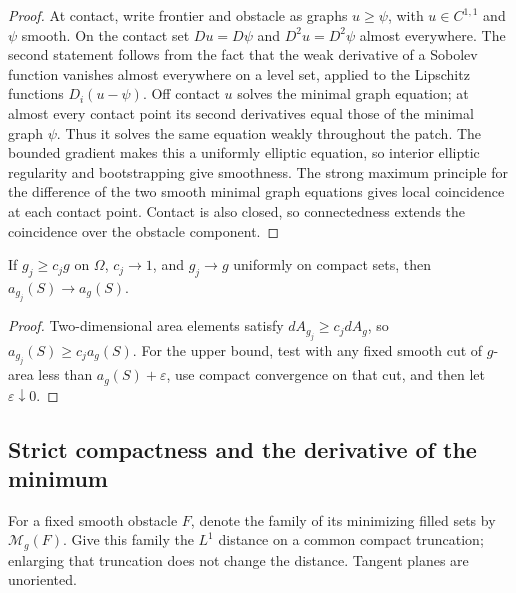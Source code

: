 \begin{proof}
At contact, write frontier and obstacle as graphs $u\geq\psi$, with
$u\in C^{1,1}$ and $\psi$ smooth. On the contact set $Du=D\psi$ and
$D^2u=D^2\psi$ almost everywhere. The second statement follows from
the fact that the weak derivative of a Sobolev function vanishes
almost everywhere on a level set, applied to the Lipschitz functions
$D_i(u-\psi)$. Off contact $u$ solves the minimal graph equation; at
almost every contact point its second derivatives equal those of
the minimal graph $\psi$. Thus it solves the same equation weakly
throughout the patch. The bounded gradient makes this a uniformly
elliptic equation, so interior elliptic regularity and bootstrapping
give smoothness. The strong maximum principle for the difference of
the two smooth minimal graph equations gives local coincidence at
each contact point. Contact is also closed, so connectedness extends
the coincidence over the obstacle component.
\end{proof}

\begin{corollary}
\label{ct:metric-comparison}
If $g_j\geq c_jg$ on $\Omega$, $c_j\to1$, and $g_j\to g$ uniformly
on compact sets, then $a_{g_j}(S)\to a_g(S)$.
\end{corollary}

\begin{proof}
Two-dimensional area elements satisfy $dA_{g_j}\geq c_jdA_g$, so
$a_{g_j}(S)\geq c_ja_g(S)$. For the upper bound, test with any fixed
smooth cut of $g$-area less than $a_g(S)+\varepsilon$, use compact
convergence on that cut, and then let $\varepsilon\downarrow0$.
\end{proof}

\subsection{Strict compactness and the derivative of the minimum}
\label{ct:variation-subsection}

For a fixed smooth obstacle $F$, denote the family of its minimizing
filled sets by $\mathcal M_g(F)$. Give this family the $L^1$ distance
on a common compact truncation; enlarging that truncation does not
change the distance. Tangent planes are unoriented.

